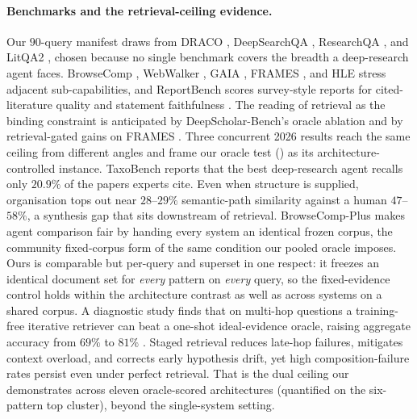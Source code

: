 \documentclass[11pt]{article}
\begin{document}
\paragraph{Benchmarks and the retrieval-ceiling evidence.} Our $90$-query manifest
draws from DRACO \citep{draco2026}, DeepSearchQA \citep{deepsearchqa2026}, ResearchQA
\citep{researchqa2025}, and LitQA2 \citep{litqa2024}, chosen because no single
benchmark covers the breadth a deep-research agent faces. BrowseComp
\citep{wei2025browsecomp}, WebWalker \citep{webwalker2025}, GAIA \citep{mialon2024gaia},
FRAMES \citep{krishna2024frames}, and HLE \citep{phan2025hle} stress adjacent
sub-capabilities, and ReportBench scores survey-style reports for cited-literature
quality and statement faithfulness \citep{reportbench2025}. The
reading of retrieval as the binding constraint is anticipated by DeepScholar-Bench's oracle
ablation \citep{deepscholarbench2025} and by retrieval-gated gains on FRAMES
\citep{krishna2024frames}. Three concurrent 2026 results reach the same ceiling from
different angles and frame our oracle test () as its
architecture-controlled instance. TaxoBench \citep{taxobench2026} reports that the best
deep-research agent recalls only $20.9\%$ of the papers experts cite. Even when
structure is supplied, organisation tops out near $28$--$29\%$ semantic-path similarity
against a human $47$--$58\%$, a synthesis gap that sits downstream of retrieval.
BrowseComp-Plus \citep{browsecompplus2025} makes agent comparison fair by handing every
system an identical frozen corpus, the community fixed-corpus form of the same
condition our pooled oracle imposes. Ours is comparable but per-query and superset in
one respect: it freezes an identical document set for \emph{every} pattern on
\emph{every} query, so the fixed-evidence control holds within the architecture
contrast as well as across systems on a shared corpus. A diagnostic study finds that on
multi-hop questions a training-free iterative retriever can beat a one-shot
ideal-evidence oracle, raising aggregate accuracy from $69\%$ to $81\%$
\citep{iterativeideal2026}. Staged retrieval reduces late-hop failures, mitigates
context overload, and corrects early hypothesis drift, yet high composition-failure
rates persist even under perfect retrieval. That is the dual ceiling our
 demonstrates across eleven oracle-scored architectures (quantified on
the six-pattern top cluster), beyond the single-system setting.
\end{document}
